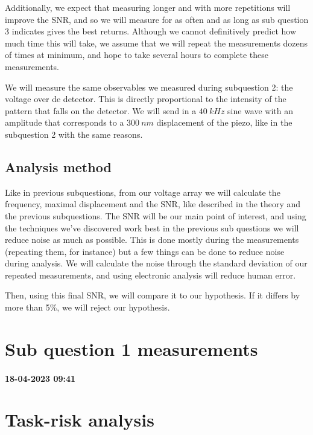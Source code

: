 \documentclass[a4paper,11pt]{article} %
\begin{document}
Additionally, we expect that measuring longer and with more repetitions will improve the SNR, and so we will measure for as often and as long as sub question 3 indicates gives the best returns. Although we cannot definitively predict how much time this will take, we assume that we will repeat the measurements dozens of times at minimum, and hope to take several hours to complete these measurements.

We will measure the same observables we measured during subquestion 2: the voltage over de detector. This is directly proportional to the intensity of the pattern that falls on the detector. We will send in a $\SI{40}{kHz}$ sine wave with an amplitude that corresponds to a $\SI{300}{nm}$ displacement of the piezo, like in the subquestion 2 with the same reasons.

\subsection{Analysis method}
Like in previous subquestions, from our voltage array we will calculate the frequency, maximal displacement and the SNR, like described in the theory and the previous subquestions. The SNR will be our main point of interest, and using the techniques we've discovered work best in the previous sub questions we will reduce noise as much as possible. This is done mostly during the measurements (repeating them, for instance) but a few things can be done to reduce noise during analysis. We will calculate the noise through the standard deviation of our repeated measurements, and using electronic analysis will reduce human error. 

Then, using this final SNR, we will compare it to our hypothesis. If it differs by more than 5\%, we will reject our hypothesis.

\section{Sub question 1 measurements}
\paragraph{18-04-2023 09:41} 

\section{Task-risk analysis}
\end{document}
